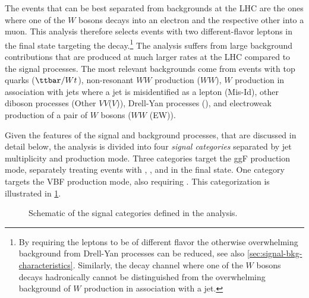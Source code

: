 The \HWW events that can be best separated from backgrounds at the LHC are the ones where one of the $W$ bosons decays into an electron and the respective other into a muon.
This analysis therefore selects events with two different-flavor leptons in the final state targeting the \HWWdet decay.\footnote{By requiring the leptons to be of different flavor the otherwise overwhelming background from Drell-Yan processes can be reduced, see also \cref{sec:signal-bkg-characteristics}. Similarly, the decay channel where one of the $W$ bosons decays hadronically cannot be distinguished from the overwhelming background of $W$ production in association with a jet.} 
The analysis suffers from large background contributions that are produced at much larger rates at the LHC compared to the signal processes. The most relevant backgrounds come from events with top quarks ($\ttbar/Wt$), non-resonant $WW$ production ($WW$), $W$ production in association with jets where a jet is misidentified as a lepton (Mis-Id), other diboson processes (Other $VV$($V$)), Drell-Yan processes (\Zgamma), and electroweak production of a pair of $W$ bosons ($WW$ (EW)). 

Given the features of the signal and background processes, that are discussed in detail below, the analysis is divided into four \emph{signal categories} separated by jet multiplicity and production mode.
Three categories target the ggF production mode, separately treating events with \ZeroJet, \OneJet, and \TwoJet in the final state. One category targets the VBF production mode, also requiring \TwoJet. 
This categorization is illustrated in \cref{fig:signal-categorization}.
\begin{figure}[ht]
    \caption{Schematic of the signal categories defined in the \HWW analysis.}
    \label{fig:signal-categorization}
\end{figure}

